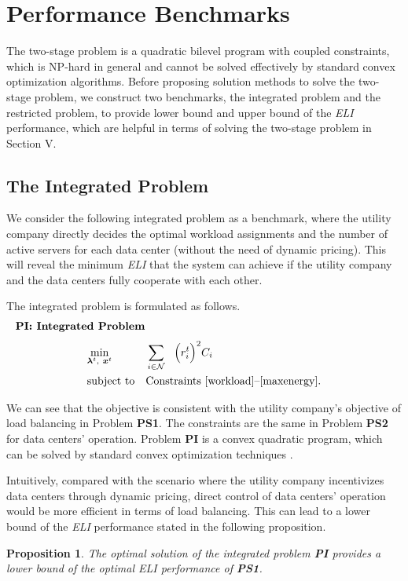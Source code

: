 \documentclass[journal]{IEEEtran}
\newtheorem{proposition}{Proposition}
\begin{document}
		
	
	\section{Performance Benchmarks}
	The two-stage problem is a quadratic bilevel program with coupled constraints, which is NP-hard in general and cannot be solved effectively by standard convex optimization algorithms. Before proposing solution methods to solve the two-stage problem, we construct two benchmarks, the integrated problem and the restricted problem, to provide lower bound and upper bound of the \emph{ELI} performance, which are helpful in terms of solving the two-stage problem in Section V.
	

	\subsection{The Integrated Problem}
	We consider the following integrated problem as a benchmark, where the utility company directly decides the optimal workload assignments and the number of active servers for each data center (without the need of dynamic pricing). This will reveal the minimum \emph{ELI} that the system can achieve if the utility company and the data centers fully cooperate with each other.
	
	The integrated problem is formulated as follows.
	\begin{align*}
		\leftline{\textbf{PI: Integrated Problem}}
	\end{align*}
	\begin{equation*}
		\begin{aligned}
			& \underset{\boldsymbol{\lambda}^{t},~\boldsymbol{x}^{t}} {\min}
			& & \sum_{i \in \mathcal{N}}
			~~ \Big( r_{i}^{t} \Big) ^{2} C_{i} \\
			& \text{subject to}
			& & \text{Constraints \eqref{workload}--\eqref{maxenergy}}.
		\end{aligned}
	\end{equation*}
	
	We can see that the objective is consistent with the utility company's objective of load balancing in Problem \textbf{PS1}. The constraints are the same in Problem \textbf{PS2} for data centers' operation. Problem \textbf{PI} is a convex quadratic program, which can be solved by standard convex optimization techniques \cite{convex}. 
	
	Intuitively, compared with the scenario where the utility company incentivizes data centers through dynamic pricing, direct control of data centers' operation would be more efficient in terms of load balancing. This can lead to a lower bound of the \emph{ELI} performance stated in the following proposition.
	\begin{proposition}\label{lowerbound}
		The optimal solution of the integrated problem \textbf{PI} provides a lower bound of the optimal \emph{ELI} performance of \textbf{PS1}.
	\end{proposition}
	
\end{document}
